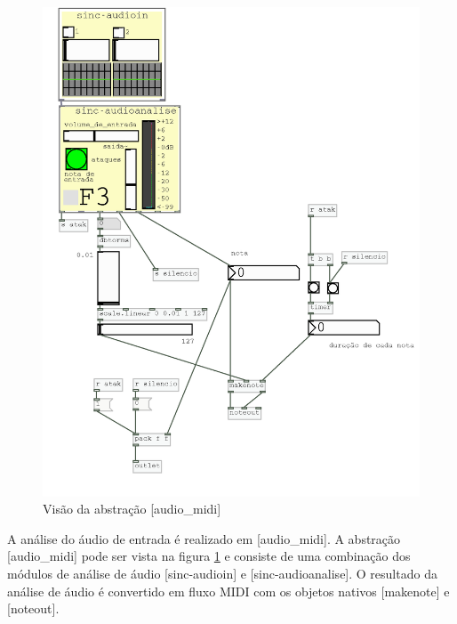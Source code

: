 \documentclass{ppgmus}
\begin{document}
\begin{figure}
\includegraphics[scale=.6]{audio-midi}
\caption{Visão da abstração [audio\_midi]}
\label{audio-midi}
\end{figure}

A análise do áudio de entrada é realizado em [audio\_midi].
A abstração [audio\_midi] pode ser vista na figura \ref{audio-midi} e consiste
de uma combinação dos módulos de análise de áudio [sinc-audioin] e [sinc-audioanalise].
O resultado da análise de áudio é convertido em fluxo MIDI com os objetos nativos 
[makenote] e [noteout]. 
\end{document}
